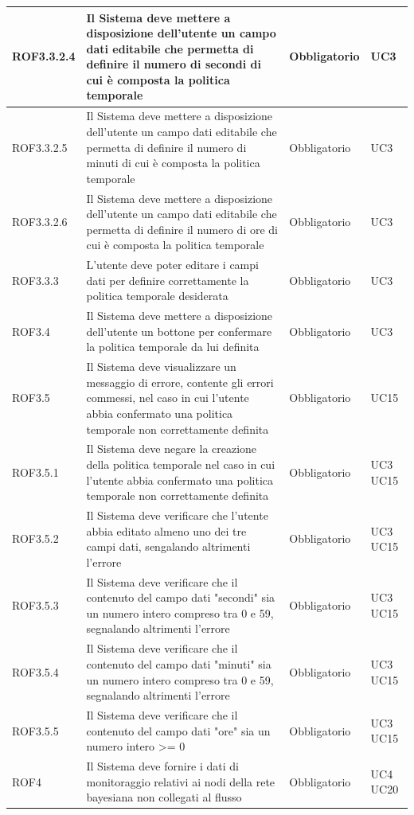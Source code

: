 \begin{center}
\begin{longtable}[c]{|m{}|m{}|m{}|m{}|}
\hline
ROF3.3.2.4 & Il Sistema deve mettere a disposizione dell'utente un campo dati editabile che permetta di definire il numero di secondi di cui è composta la politica temporale & Obbligatorio & UC3\\
\hline
ROF3.3.2.5 & Il Sistema deve mettere a disposizione dell'utente un campo dati editabile che permetta di definire il numero di minuti di cui è composta la politica temporale & Obbligatorio & UC3\\
\hline
ROF3.3.2.6 & Il Sistema deve mettere a disposizione dell'utente un campo dati editabile che permetta di definire il numero di ore di cui è composta la politica temporale & Obbligatorio & UC3\\
\hline
ROF3.3.3 & L'utente deve poter editare i campi dati per definire correttamente la politica temporale desiderata & Obbligatorio & UC3\\
\hline
\rowcolor{grigio}ROF3.4 & Il Sistema deve mettere a disposizione dell'utente un bottone per confermare la politica temporale da lui definita & Obbligatorio & UC3\\
\hline
ROF3.5 & Il Sistema deve visualizzare un messaggio di errore, contente gli errori commessi, nel caso in cui l'utente abbia confermato una politica temporale non correttamente definita & Obbligatorio & UC15\\
\hline
ROF3.5.1 & Il Sistema deve negare la creazione della politica temporale nel caso in cui l'utente abbia confermato una politica temporale non correttamente definita & Obbligatorio & UC3 UC15 \\
\hline
ROF3.5.2 & Il Sistema deve verificare che l'utente abbia editato almeno uno dei tre campi dati, sengalando altrimenti l'errore & Obbligatorio & UC3 UC15\\
\hline
ROF3.5.3 & Il Sistema deve verificare che il contenuto del campo dati "secondi" sia un numero intero compreso tra 0 e 59, segnalando altrimenti l'errore & Obbligatorio & UC3 UC15\\
\hline
ROF3.5.4 & Il Sistema deve verificare che il contenuto del campo dati "minuti" sia un numero intero compreso tra 0 e 59, segnalando altrimenti l'errore & Obbligatorio & UC3 UC15\\
\hline
ROF3.5.5 & Il Sistema deve verificare che il contenuto del campo dati "ore" sia un numero intero >= 0 & Obbligatorio & UC3 UC15\\
\hline
\rowcolor{grigio}ROF4 & Il Sistema deve fornire i dati di monitoraggio relativi ai nodi della rete bayesiana non collegati al flusso & Obbligatorio & UC4 UC20\\

\end{longtable}
\end{center}
